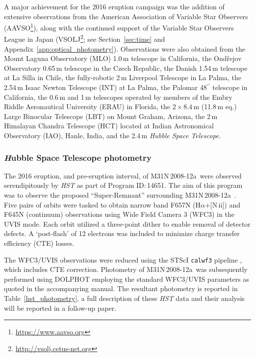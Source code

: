 \documentclass[twocolumn,tighten]{aastex6}
\def\novak{{M31N\,2008-12a}}
\newcommand{\otwok}{\citetalias{2015A&A...580A..45D}}
\begin{document}
A major achievement for the 2016 eruption campaign was the addition of extensive observations from the American Association of Variable Star Observers (AAVSO\footnote{\url{https://www.aavso.org}}), along with the continued support of the Variable Star Observers League in Japan (VSOLJ\footnote{\url{http://vsolj.cetus-net.org}}; see Section~\ref{sec:time} and Appendix~\ref{app:optical_photometry}).  Observations were also obtained from the Mount Laguna Observatory (MLO) 1.0\,m telescope in California, the Ond\v{r}ejov Observatory 0.65\,m telescope in the Czech Republic, the Danish 1.54\,m telescope at La Silla in Chile, the fully-robotic 2\,m Liverpool Telescope \citep[LT;][]{2004SPIE.5489..679S} in La Palma, the 2.54\,m Isaac Newton Telescope (INT) at La Palma, the Palomar 48$^{\prime\prime}$ telescope in California, the 0.6\,m and 1\,m telescopes operated by members of the Embry Riddle Aeronautical University (ERAU) in Florida, the $2\times8.4$\,m (11.8\,m eq.) Large Binocular Telescope (LBT) on Mount Graham, Arizona, the 2\,m Himalayan Chandra Telescope (HCT) located at Indian Astronomical Observatory (IAO), Hanle, India, and the 2.4\,m {\it Hubble Space Telescope}.

\subsubsection{{\textit Hubble Space Telescope} photometry}

The 2016 eruption, and pre-eruption interval, of \novak\ were observed serendipitously by {\it HST} as part of Program ID:\,14651.  The aim of this program was to observe the proposed ``Super-Remnant'' surrounding \novak\ \citep[see \otwok\ and][]{2017arXiv171204872D}. Five pairs of orbits were tasked to obtain narrow band F657N (H$\alpha$+[N\,{\sc ii}]) and F645N (continuum) observations using Wide Field Camera 3 (WFC3) in the UVIS mode.  Each orbit utilized a three-point dither to enable removal of detector defects.  A `post-flash' of 12 electrons was included to minimize charge transfer efficiency (CTE) losses.

The WFC3/UVIS observations were reduced using the STScI {\tt calwf3} pipeline \citep[v3.4;][]{2012wfci.book.....D}, which includes CTE correction.  Photometry of \novak\ was subsequently performed using DOLPHOT \citep[v2.0\footnote{\url{http://americano.dolphinsim.com/dolphot}};][]{2000PASP..112.1383D} employing the standard WFC3/UVIS parameters as quoted in the accompanying manual.  The resultant photometry is reported in Table~\ref{hst_photometry}, a full description of these {\it HST} data and their analysis will be reported in a follow-up paper.
\end{document}
